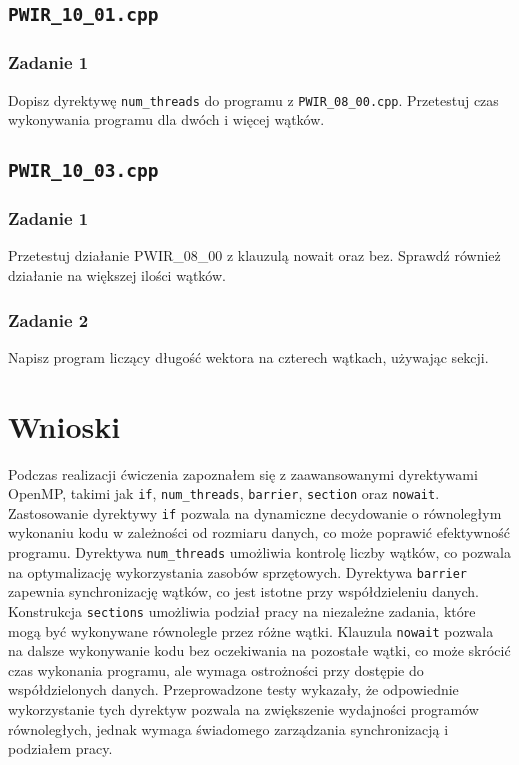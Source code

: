 \documentclass{article}
\begin{document}
    \subsection{\texttt{PWIR\_10\_01.cpp}}
    \subsubsection{Zadanie 1}
    Dopisz dyrektywę \texttt{num\_threads} do programu z \texttt{PWIR\_08\_00.cpp}. Przetestuj czas wykonywania programu dla dwóch i więcej wątków. 
    \clearpage
    \subsection{\texttt{PWIR\_10\_03.cpp}}
    \subsubsection{Zadanie 1}
    Przetestuj działanie  PWIR\_08\_00 z klauzulą nowait oraz bez. Sprawdź również działanie na 
większej ilości wątków.
    
    \clearpage
    \subsubsection{Zadanie 2}
    Napisz program liczący długość wektora na czterech wątkach, używając sekcji.
    \clearpage
    



    \section{Wnioski}
    Podczas realizacji ćwiczenia zapoznałem się z zaawansowanymi dyrektywami OpenMP, takimi jak \texttt{if}, \texttt{num\_threads}, \texttt{barrier}, \texttt{section} oraz \texttt{nowait}. Zastosowanie dyrektywy \texttt{if} pozwala na dynamiczne decydowanie o równoległym wykonaniu kodu w zależności od rozmiaru danych, co może poprawić efektywność programu. Dyrektywa \texttt{num\_threads} umożliwia kontrolę liczby wątków, co pozwala na optymalizację wykorzystania zasobów sprzętowych. Dyrektywa \texttt{barrier} zapewnia synchronizację wątków, co jest istotne przy współdzieleniu danych. Konstrukcja \texttt{sections} umożliwia podział pracy na niezależne zadania, które mogą być wykonywane równolegle przez różne wątki. Klauzula \texttt{nowait} pozwala na dalsze wykonywanie kodu bez oczekiwania na pozostałe wątki, co może skrócić czas wykonania programu, ale wymaga ostrożności przy dostępie do współdzielonych danych. Przeprowadzone testy wykazały, że odpowiednie wykorzystanie tych dyrektyw pozwala na zwiększenie wydajności programów równoległych, jednak wymaga świadomego zarządzania synchronizacją i podziałem pracy.
\end{document}

